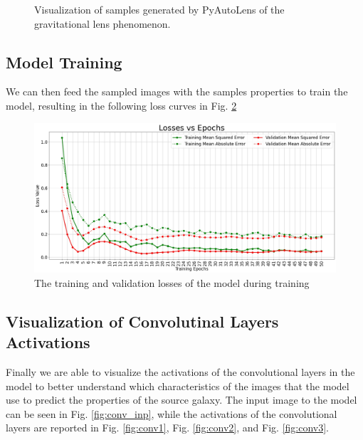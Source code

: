 \documentclass[12pt]{article}
\begin{document}
\begin{figure}[thb]
    \caption{Visualization of samples generated by PyAutoLens\cite{pyautolens} of the gravitational lens phenomenon.}
    \label{fig:samples}
\end{figure}

\subsection{Model Training}
We can then feed the sampled images with the samples properties to train the model, resulting in the following loss curves in Fig. \ref{fig:loss}


\begin{figure}[thb]
    \centering
    \includegraphics[width=\textwidth]{../figures/loss_epochs.jpg}
    \caption{The training and validation losses of the model during training}
    \label{fig:loss}
\end{figure}


\subsection{Visualization of Convolutinal Layers Activations}
Finally we are able to visualize the activations of the convolutional layers in the model to better understand which characteristics of the images that the model use to predict the properties of the source galaxy. The input image to the model can be seen in Fig. \ref{fig:conv_inp}, while the activations of the convolutional layers are reported in Fig. \ref{fig:conv1}, Fig. \ref{fig:conv2}, and Fig. \ref{fig:conv3}.
\end{document}
